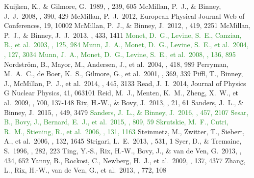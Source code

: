 \documentclass[iop,revtex4]{emulateapj}
\newcommand{\NEW}[1]{\textcolor{ForestGreen}{#1}}
\begin{document}
\begin{thebibliography}{}
 Kuijken, K., \& Gilmore, G.\ 1989, \mnras, 239, 605 
 McMillan, P.~J., \& Binney, J.~J.\ 2008, \mnras, 390, 429 
 McMillan, P.~J.\ 2012, European Physical Journal Web of Conferences, 19, 10002 
 McMillan, P.~J., \& Binney, J.\ 2012, \mnras, 419, 2251 
 McMillan, P.~J., \& Binney, J.~J.\ 2013, \mnras, 433, 1411
 \NEW{Monet, D.~G., Levine, S.~E., Canzian, B., et al.\ 2003, \aj, 125, 984}
 \NEW{Munn, J.~A., Monet, D.~G., Levine, S.~E., et al.\ 2004, \aj, 127, 3034}
 \NEW{Munn, J.~A., Monet, D.~G., Levine, S.~E., et al.\ 2008, \aj, 136, 895}
 Nordstr{\"o}m, B., Mayor, M., Andersen, J., et al.\ 2004, \aap, 418, 989 
 Perryman, M.~A.~C., de Boer, K.~S., Gilmore, G., et al.\ 2001, \aap, 369, 339 
 Piffl, T., Binney, J., McMillan, P.~J., et al.\ 2014, \mnras, 445, 3133
 Read, J.~I.\ 2014, Journal of Physics G Nuclear Physics, 41, 063101 
 Reid, M.~J., Menten, K.~M., Zheng, X.~W., et al.\ 2009, \apj, 700, 137-148 
 Rix, H.-W., \& Bovy, J.\ 2013, \aapr, 21, 61
 Sanders, J.~L., \& Binney, J.\ 2015, \mnras, 449, 3479
 \NEW{Sanders, J.~L., \& Binney, J.\ 2016, \mnras, 457, 2107}
 \NEW{Sesar, B., Bovy, J., Bernard, E.~J., et al.\ 2015, \apj, 809, 59}
 \NEW{Skrutskie, M.~F., Cutri, R.~M., Stiening, R., et al.\ 2006, \aj, 131, 1163} 
 Steinmetz, M., Zwitter, T., Siebert, A., et al.\ 2006, \aj, 132, 1645 
 Strigari, L.~E.\ 2013, \physrep, 531, 1 
 Syer, D., \& Tremaine, S.\ 1996, \mnras, 282, 223 
 Ting, Y.-S., Rix, H.-W., Bovy, J., \& van de Ven, G.\ 2013, \mnras, 434, 652
 Yanny, B., Rockosi, C., Newberg, H.~J., et al.\ 2009, \aj, 137, 4377 
 Zhang, L., Rix, H.-W., van de Ven, G., et al.\ 2013, \apj, 772, 108
\end{thebibliography}
\end{document}
